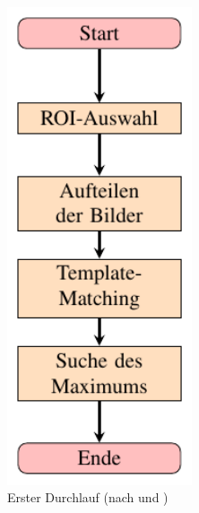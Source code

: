 \begin{figure}[htbp]
\begin{subfigure}[b]{0.3\textwidth}
		\label{fig:graph_speckle}
	\end{subfigure}
	\hfill
	\begin{subfigure}[b]{0.3\textwidth}
		\centering
		\includegraphics[width=0.6\textwidth]{pdf/graph_first_pass}
		\caption[Erster Durchlauf]{Erster Durchlauf (nach \cite{Ber12} und \cite{Coj17})}
		\label{fig:graph_first}
	\end{subfigure}
	\hfill
	\begin{subfigure}[b]{0.3\textwidth}
		\centering

\end{subfigure}
\end{figure}
